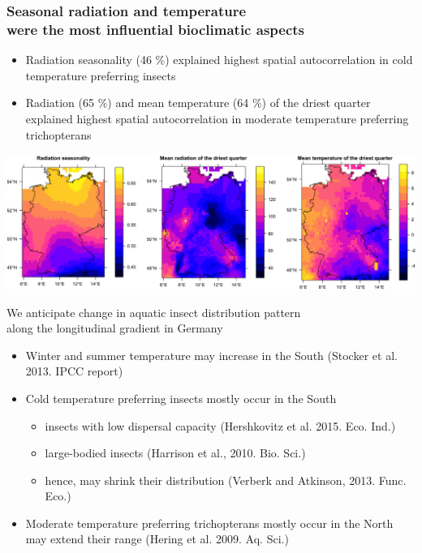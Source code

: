\documentclass[10pt, compress]{beamer}
\begin{document}
\begin{frame}[fragile]
\frametitle{Seasonal radiation and temperature\protect\\were the most influential bioclimatic aspects}
\begin{itemize}
\item \alert{Radiation seasonality (46 \%)} explained highest spatial autocorrelation in cold temperature preferring insects
\pause
\item \alert{Radiation (65 \%) and mean temperature (64 \%) of the driest quarter} explained highest spatial autocorrelation in moderate temperature preferring trichopterans
\end{itemize}
\pause
\centering
\includegraphics[width=1\textwidth]{images/Inf_Bio.png}
\end{frame}


\begin{frame}{We anticipate change in aquatic insect distribution pattern\protect\\ along the longitudinal gradient in Germany}
\begin{itemize}
\item \alert{Winter and summer temperature may increase in the South} \footnotesize{(Stocker et al. 2013. IPCC report)}
\pause
\item \normalsize \alert{Cold temperature preferring insects} mostly occur in the South\\
\pause
\vspace{10pt}
\begin{itemize}
\item insects with low dispersal capacity \footnotesize{(Hershkovitz et al. 2015. Eco. Ind.)}\\
\pause
\vspace{10pt}
\item \normalsize large-bodied insects \footnotesize{(Harrison et al., 2010. Bio. Sci.)}\\
\pause
\vspace{10pt}
\item \normalsize \alert{hence, may shrink their distribution} \footnotesize (Verberk and Atkinson, 2013. Func. Eco.)
\end{itemize}
\pause
\medskip
\item \normalsize \alert{Moderate temperature preferring trichopterans} mostly occur in the North may extend their range \footnotesize{(Hering et al. 2009. Aq. Sci.)}
\end{itemize}
\end{frame}
\end{document}

